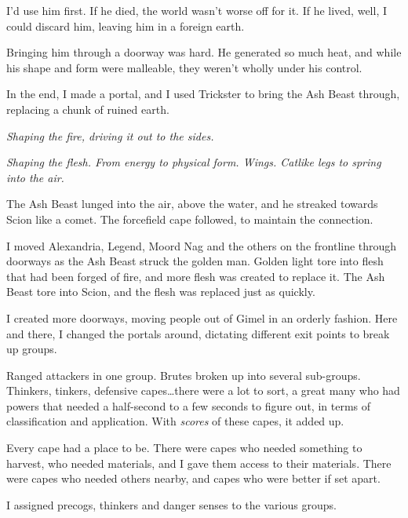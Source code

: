 I'd use him first.  If he died, the world wasn't worse off for it.  If he lived, well, I could discard him, leaving him in a foreign earth.



Bringing him through a doorway was hard.  He generated so much heat, and while his shape and form were malleable, they weren't wholly under his control.



In the end, I made a portal, and I used Trickster to bring the Ash Beast through, replacing a chunk of ruined earth.



\emph{Shaping the fire, driving it out to the sides.}



\emph{Shaping the flesh.  From energy to physical form.  Wings.   Catlike legs to spring into the air.}



The Ash Beast lunged into the air, above the water, and he streaked towards Scion like a comet.  The forcefield cape followed, to maintain the connection.



I moved Alexandria, Legend, Moord Nag and the others on the frontline through doorways as the Ash Beast struck the golden man.  Golden light tore into flesh that had been forged of fire, and more flesh was created to replace it.  The Ash Beast tore into Scion, and the flesh was replaced just as quickly.



I created more doorways, moving people out of Gimel in an orderly fashion.  Here and there, I changed the portals around, dictating different exit points to break up groups.



Ranged attackers in one group.  Brutes broken up into several sub-groups.  Thinkers, tinkers, defensive capes\ldots there were a lot to sort, a great many who had powers that needed a half-second to a few seconds to figure out, in terms of classification and application.  With \emph{scores} of these capes, it added up.



Every cape had a place to be.  There were capes who needed something to harvest, who needed materials, and I gave them access to their materials.  There were capes who needed others nearby, and capes who were better if set apart.



I assigned precogs, thinkers and danger senses to the various groups.



